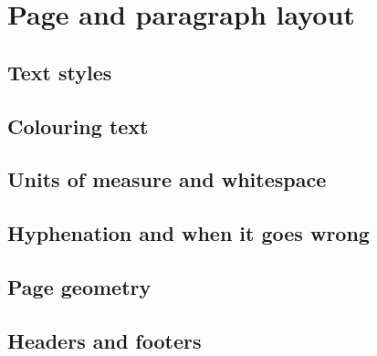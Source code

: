 \chapter{Page and paragraph layout}

\section{Text styles}

\section{Colouring text}

\section{Units of measure and whitespace}

\section{Hyphenation and when it goes wrong}

\section{Page geometry}

\section{Headers and footers}
